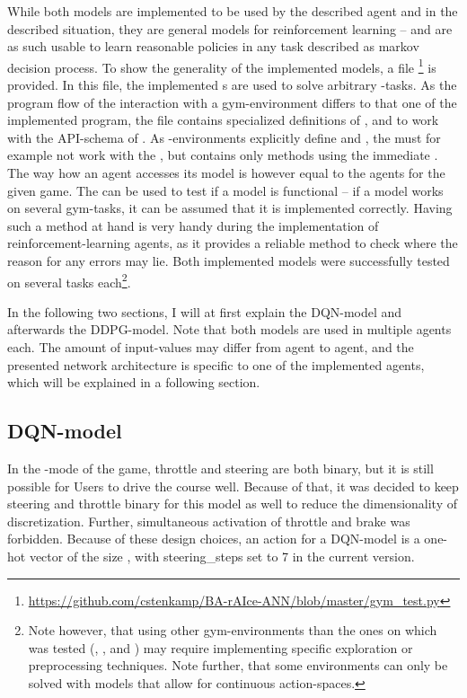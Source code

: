 While both models are implemented to be used by the described agent and in the described situation, they are general models for reinforcement learning -- and are as such usable to learn reasonable policies in any task described as markov decision process. To show the generality of the implemented models, a file \footnote{\url{https://github.com/cstenkamp/BA-rAIce-ANN/blob/master/gym\_test.py}} is provided. In this file, the implemented s are used to solve arbitrary -tasks. As the program flow of the interaction with a gym-environment differs to that one of the implemented program, the file contains specialized definitions of ,  and  to work with the API-schema of . As -environments explicitly define  and , the  must for example not work with the , but contains only methods using the immediate . The way how an agent accesses its model is however equal to the agents for the given game. The  can be used to test if a model is functional -- if a model works on several gym-tasks, it can be assumed that it is implemented correctly. Having such a method at hand is very handy during the implementation of reinforcement-learning agents, as it provides a reliable method to check where the reason for any errors may lie. Both implemented models were successfully tested on several tasks each\footnote{Note however, that using other gym-environments than the ones on which was tested (, ,  and ) may require implementing specific exploration or preprocessing techniques. Note further, that some environments can only be solved with models that allow for continuous action-spaces.}.


In the following two sections, I will at first explain the DQN-model and afterwards the DDPG-model. Note that both models are used in multiple agents each. The amount of input-values may differ from agent to agent, and the presented network architecture is specific to one of the implemented agents, which will be explained in a following section.


\subsection{DQN-model}

In the -mode of the game, throttle and steering are both binary, but it is still possible for Users to drive the course well. Because of that, it was decided to keep steering and throttle binary for this model as well to reduce the dimensionality of discretization. Further, simultaneous activation of throttle and brake was forbidden. Because of these design choices, an action for a DQN-model is a one-hot vector of the size , with steering\_steps set to 7 in the current version. 

